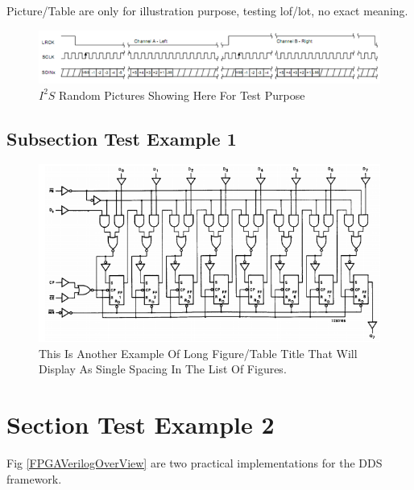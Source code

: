  Picture/Table are only for illustration purpose, testing lof/lot, no exact meaning.
\begin{figure}[!hbp]
\begin{center}
\includegraphics[width=\textwidth]{graphic/I2S_24Bit_Format.bmp}
\caption{$I^{2}S$ Random Pictures Showing Here For Test Purpose}
\label{fig:I2S_Timing}
\end{center}
\end{figure}


\subsection{Subsection Test Example 1}

\begin{figure}[!htbp]
\begin{center}
\includegraphics[width=\textwidth]{graphic/LogicDiagram_OSERDES.PNG}
\caption[\protect\vspace{-2.8ex}{This Is Another Example Of Long Figure/Table Title That Will Display As Single Spacing In The List Of Figures.}]{This Is Another Example Of Long Figure/Table Title That Will Display As Single Spacing In The List Of Figures.}
\label{fig:OSERDES}
\end{center}
\end{figure}



\section{Section Test Example 2}

 Fig \ref{FPGAVerilogOverView} are two practical implementations for the DDS framework.

